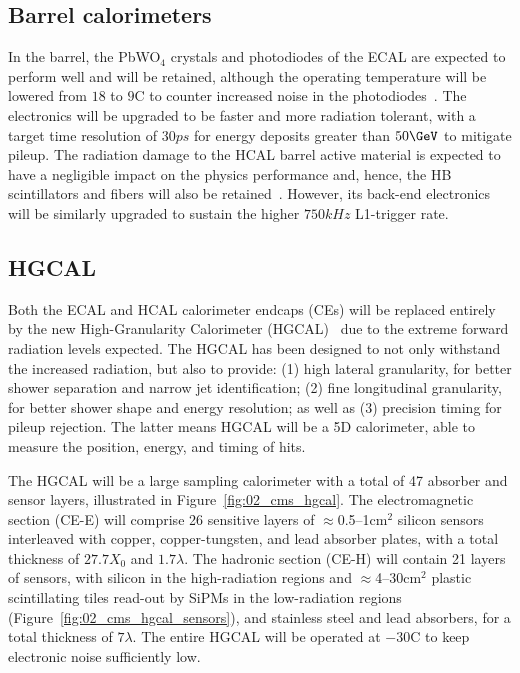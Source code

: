 \subsection{Barrel calorimeters}

In the barrel, the PbWO$_4$ crystals and photodiodes of the ECAL are expected to perform well and will be retained, although the operating temperature will be lowered from $18$ to $9$C to counter increased noise in the photodiodes~\cite{Cooke:2022lbl}.
The electronics will be upgraded to be faster and more radiation tolerant, with a target time resolution of $30\unit{ps}$ for energy deposits greater than $50\GeV$ to mitigate pileup.
The radiation damage to the HCAL barrel active material is expected to have a negligible impact on the physics performance and, hence, the HB scintillators and fibers will also be retained~\cite{CERN-LHCC-2017-011}.
However, its back-end electronics will be similarly upgraded to sustain the higher $750\unit{kHz}$ L1-trigger rate.

\subsection{HGCAL}
\label{sec:02_cms_hgcal}

Both the ECAL and HCAL calorimeter endcaps (CEs) will be replaced entirely by the new High-Granularity Calorimeter (HGCAL)~\cite{CMS:2017jpq} due to the extreme forward radiation levels expected.
The HGCAL has been designed to not only withstand the increased radiation, but also to provide: (1) high lateral granularity, for better shower separation and narrow jet identification; (2) fine longitudinal granularity, for better shower shape and energy resolution; as well as (3) precision timing for pileup rejection.
The latter means HGCAL will be a 5D calorimeter, able to measure the position, energy, and timing of hits.

The HGCAL will be a large sampling calorimeter with a total of 47 absorber and sensor layers, illustrated in Figure~\ref{fig:02_cms_hgcal}.
The electromagnetic section (CE-E) will comprise 26 sensitive layers of $\approx$0.5--1\unit{cm}$^2$ silicon sensors interleaved with copper, copper-tungsten, and lead absorber plates, with a total thickness of $27.7X_0$ and $1.7\lambda$.
The hadronic section (CE-H) will contain 21 layers of sensors, with silicon in the high-radiation regions and $\approx$4--30\unit{cm}$^2$ plastic scintillating tiles read-out by SiPMs in the low-radiation regions (Figure~\ref{fig:02_cms_hgcal_sensors}), and stainless steel and lead absorbers, for a total thickness of $7\lambda$.
The entire HGCAL will be operated at $-30$C to keep electronic noise sufficiently low.

